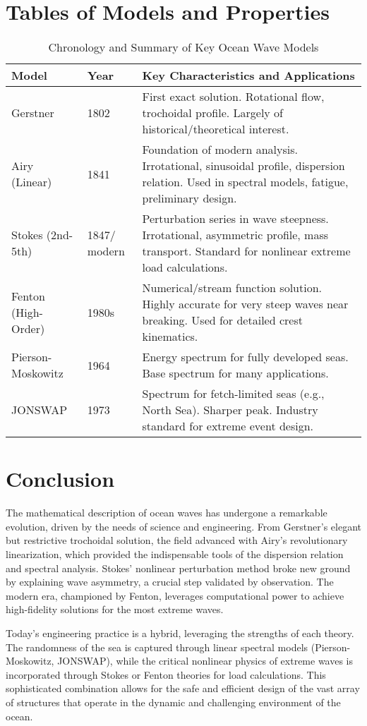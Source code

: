 \documentclass[11pt,letterpaper]{article}
\begin{document}
\section{Tables of Models and Properties}
\begin{table}[H]
\centering
\caption{Chronology and Summary of Key Ocean Wave Models}
\begin{tabular}{@{}llL{6cm}@{}}
\toprule
Model & Year & Key Characteristics and Applications \\
\midrule
Gerstner & 1802 & First exact solution. Rotational flow, trochoidal profile. Largely of historical/theoretical interest. \\
Airy (Linear) & 1841 & Foundation of modern analysis. Irrotational, sinusoidal profile, dispersion relation. Used in spectral models, fatigue, preliminary design. \\
Stokes (2nd-5th) & 1847/ modern & Perturbation series in wave steepness. Irrotational, asymmetric profile, mass transport. Standard for nonlinear extreme load calculations. \\
Fenton (High-Order) & 1980s & Numerical/stream function solution. Highly accurate for very steep waves near breaking. Used for detailed crest kinematics. \\
Pierson-Moskowitz & 1964 & Energy spectrum for fully developed seas. Base spectrum for many applications. \\
JONSWAP & 1973 & Spectrum for fetch-limited seas (e.g., North Sea). Sharper peak. Industry standard for extreme event design. \\
\bottomrule
\end{tabular}
\end{table}

\section{Conclusion}
The mathematical description of ocean waves has undergone a remarkable evolution, driven by the needs of science and engineering. From Gerstner's elegant but restrictive trochoidal solution, the field advanced with Airy's revolutionary linearization, which provided the indispensable tools of the dispersion relation and spectral analysis. Stokes' nonlinear perturbation method broke new ground by explaining wave asymmetry, a crucial step validated by observation. The modern era, championed by Fenton, leverages computational power to achieve high-fidelity solutions for the most extreme waves.

Today's engineering practice is a hybrid, leveraging the strengths of each theory. The randomness of the sea is captured through linear spectral models (Pierson-Moskowitz, JONSWAP), while the critical nonlinear physics of extreme waves is incorporated through Stokes or Fenton theories for load calculations. This sophisticated combination allows for the safe and efficient design of the vast array of structures that operate in the dynamic and challenging environment of the ocean.
\end{document}
